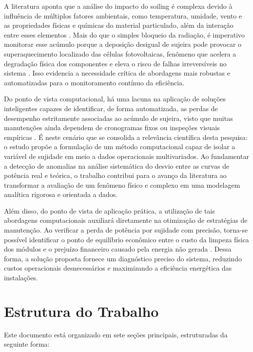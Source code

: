 \documentclass{UNESC}
\begin{document}
A literatura aponta que a análise do impacto do soiling é complexa devido à influência de múltiplos fatores ambientais, como temperatura, umidade, vento e as propriedades físicas e químicas do material particulado, além da interação entre esses elementos \cite{abuzaid2022, jaszczur2020, john2016}. Mais do que o simples bloqueio da radiação, é imperativo monitorar esse acúmulo porque a deposição desigual de sujeira pode provocar o superaquecimento localizado das células fotovoltaicas, fenômeno que acelera a degradação física dos componentes e eleva o risco de falhas irreversíveis no sistema \cite{jaszczur2020}. Isso evidencia a necessidade crítica de abordagens mais robustas e automatizadas para o monitoramento contínuo da eficiência.

Do ponto de vista computacional, há uma lacuna na aplicação de soluções inteligentes capazes de identificar, de forma automatizada, as perdas de desempenho estritamente associadas ao acúmulo de sujeira, visto que muitas manutenções ainda dependem de cronogramas fixos ou inspeções visuais empíricas \cite{Tramontin_Rampinelli_2024}. É neste cenário que se consolida a relevância científica desta pesquisa: o estudo propõe a formulação de um método computacional capaz de isolar a variável de sujidade em meio a dados operacionais multivariados. Ao fundamentar a detecção de anomalias na análise sistemática do desvio entre as curvas de potência real e teórica, o trabalho contribui para o avanço da literatura ao transformar a avaliação de um fenômeno físico e complexo em uma modelagem analítica rigorosa e orientada a dados.

Além disso, do ponto de vista de aplicação prática, a utilização de tais abordagens computacionais auxiliará diretamente na otimização de estratégias de manutenção. Ao verificar a perda de potência por sujidade com precisão, torna-se possível identificar o ponto de equilíbrio econômico entre o custo da limpeza física dos módulos e o prejuízo financeiro causado pela energia não gerada \cite{Araujo_Marques}. Dessa forma, a solução proposta fornece um diagnóstico preciso do sistema, reduzindo custos operacionais desnecessários e maximizando a eficiência energética das instalações.

\section{Estrutura do Trabalho}

Este documento está organizado em sete seções principais, estruturadas da seguinte forma:
\end{document}
